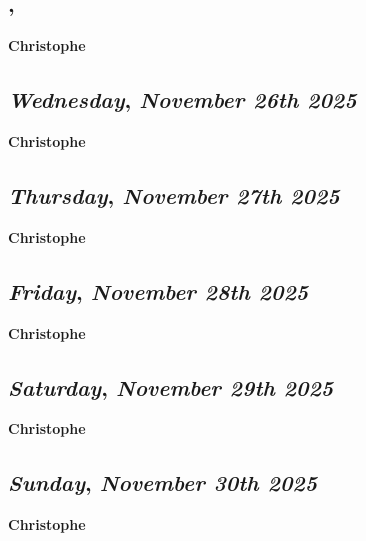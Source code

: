 \subsection*{\weekday, \day}
\textbf {Christophe}

\def\day{\textit{November 26th 2025}}
\def\weekday{\textit{Wednesday}}
\subsection*{\weekday, \day}
\textbf {Christophe}

\def\day{\textit{November 27th 2025}}
\def\weekday{\textit{Thursday}}
\subsection*{\weekday, \day}
\textbf {Christophe}

\def\day{\textit{November 28th 2025}}
\def\weekday{\textit{Friday}}
\subsection*{\weekday, \day}
\textbf {Christophe}

\def\day{\textit{November 29th 2025}}
\def\weekday{\textit{Saturday}}
\subsection*{\weekday, \day}
\textbf {Christophe}

\def\day{\textit{November 30th 2025}}
\def\weekday{\textit{Sunday}}
\subsection*{\weekday, \day}
\textbf {Christophe}
